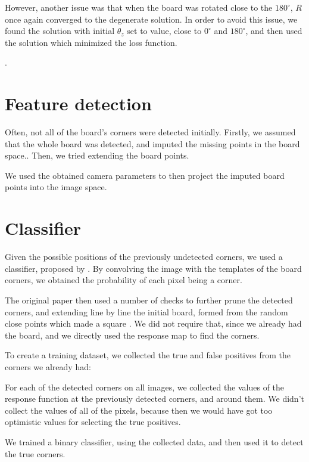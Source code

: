 However, another issue was that when the board was rotated close to the
\(180^{\circ}\), \(R\) once again converged to the degenerate solution. In order
to avoid this issue, we found the solution with initial \(\theta_z\) set to
value, close to \(0^{\circ}\) and \(180^{\circ}\), and then used the solution
which minimized the loss function.

.


\section{Feature detection}\label{sec:feature_detection}

Often, not all of the board's corners were detected initially. Firstly, we
assumed that the whole board was detected, and imputed the missing points in the
board space.. Then, we tried extending the board
points.


We used the obtained camera parameters to then project the imputed board points
into the image space.

\section{Classifier}\label{sec:classifier}

Given the possible positions of the previously undetected corners, we used a
classifier, proposed by \cite{geigerAutomaticCameraRange2012}.
By convolving the image with the templates of the board corners, we obtained the
probability of
each pixel being a corner.

The original paper then used a number of checks to further prune the detected
corners, and extending line by line the initial board, formed from the
random close points which made a square .
We did not require that, since we already had the board, and we directly used
the response map to find the corners.


To create a training dataset, we collected the true and false positives from the
corners we already had:

For each of the detected corners on all images, we collected the values of the
response function at the previously detected corners, and around them.
We didn't collect the values of all of the pixels, because then we would have
got too optimistic values for selecting the true positives.


We trained a binary classifier, using the collected data, and then used it to
detect the true corners.
